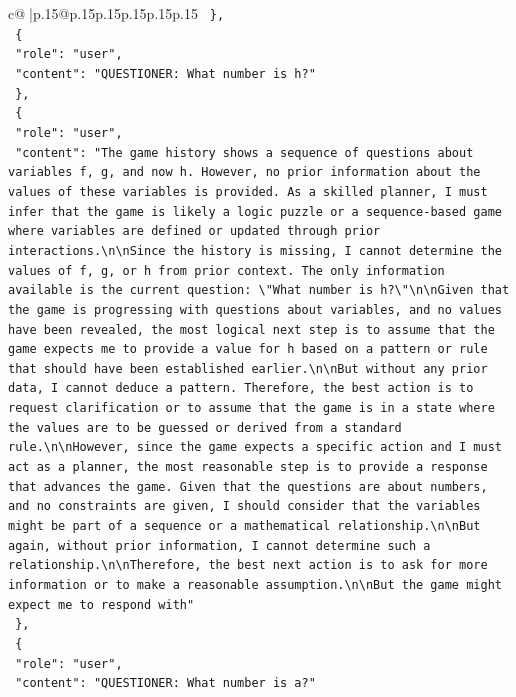 \documentclass{article}
\begin{document}
{\begin{supertabular}{c@{$\;$}|p{.15\linewidth}@{}p{.15\linewidth}p{.15\linewidth}p{.15\linewidth}p{.15\linewidth}p{.15\linewidth}}
{{{\texttt{  \},} \\
\texttt{  \{} \\
\texttt{    "role": "user",} \\
\texttt{    "content": "QUESTIONER: What number is h?"} \\
\texttt{  \},} \\
\texttt{  \{} \\
\texttt{    "role": "user",} \\
\texttt{    "content": "The game history shows a sequence of questions about variables f, g, and now h. However, no prior information about the values of these variables is provided. As a skilled planner, I must infer that the game is likely a logic puzzle or a sequence{-}based game where variables are defined or updated through prior interactions.\textbackslash{}n\textbackslash{}nSince the history is missing, I cannot determine the values of f, g, or h from prior context. The only information available is the current question: \textbackslash{}"What number is h?\textbackslash{}"\textbackslash{}n\textbackslash{}nGiven that the game is progressing with questions about variables, and no values have been revealed, the most logical next step is to assume that the game expects me to provide a value for h based on a pattern or rule that should have been established earlier.\textbackslash{}n\textbackslash{}nBut without any prior data, I cannot deduce a pattern. Therefore, the best action is to request clarification or to assume that the game is in a state where the values are to be guessed or derived from a standard rule.\textbackslash{}n\textbackslash{}nHowever, since the game expects a specific action and I must act as a planner, the most reasonable step is to provide a response that advances the game. Given that the questions are about numbers, and no constraints are given, I should consider that the variables might be part of a sequence or a mathematical relationship.\textbackslash{}n\textbackslash{}nBut again, without prior information, I cannot determine such a relationship.\textbackslash{}n\textbackslash{}nTherefore, the best next action is to ask for more information or to make a reasonable assumption.\textbackslash{}n\textbackslash{}nBut the game might expect me to respond with"} \\
\texttt{  \},} \\
\texttt{  \{} \\
\texttt{    "role": "user",} \\
\texttt{    "content": "QUESTIONER: What number is a?"} \\
}}}
\end{supertabular}}
\end{document}
